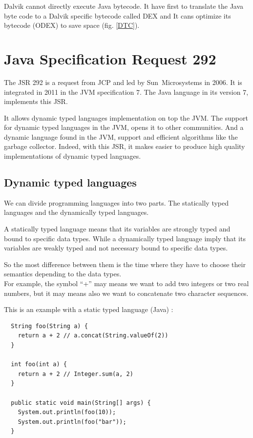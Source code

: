 \documentclass{sigplanconf}
\def \JCP{\ac{JCP}\xspace}
\def \SUN{\mbox{Sun Microsystems}\xspace}
\def \DALVIK{\mbox{Dalvik}\xspace}
\def \Jsr{\ac{JSR}\xspace}
\def \JSR{\Jsr 292\xspace}
\def \JVM{\ac{JVM}\xspace}
\def \DEX{\mbox{DEX}\xspace}
\begin{document}
      \DALVIK cannot directly execute Java bytecode.
      It have first to translate the Java byte code to a \DALVIK specific bytecode called \DEX
      and It cans optimize its bytecode (\mbox{ODEX}) to save space (fig. \ref{DTC}).

  \section{Java Specification Request 292}

    The \JSR is a request from \JCP and led by \SUN in 2006.
    It is integrated in 2011 in the \JVM specification 7.
    The Java language in its version 7, implements this \Jsr.

    It allows dynamic typed languages implementation on top the \JVM.
    The support for dynamic typed languages in the \JVM, opens it to other communities.
    And a dynamic language found in the \JVM, support and efficient algorithms like the garbage collector.
    Indeed, with this \Jsr , it makes easier to produce high quality implementations of dynamic typed languages.

    \subsection{Dynamic typed languages}
      We can divide programming languages into two parts.
      The statically typed languages and the dynamically typed languages.

      A statically typed language means that its variables are strongly typed and bound to specific data types.
      While a dynamically typed language imply that its variables are weakly typed and not necessary bound to specific data types.\cite{ieee-paulson-shift-dynamic-languages}
      
      So the most difference between them is the time where they have to choose their semantics depending to the data types.\\
      For example, the symbol ``+'' may means we want to add two integers or two real numbers,
      but it may means also we want to concatenate two character sequences.


      This is an example with a static typed language (Java) :

      {\tiny      
      \begin{verbatim}
  String foo(String a) {
    return a + 2 // a.concat(String.valueOf(2))
  }

  int foo(int a) {
    return a + 2 // Integer.sum(a, 2)
  }

  public static void main(String[] args) {
    System.out.println(foo(10));
    System.out.println(foo("bar"));
  }
      \end{verbatim}
      }
\end{document}

